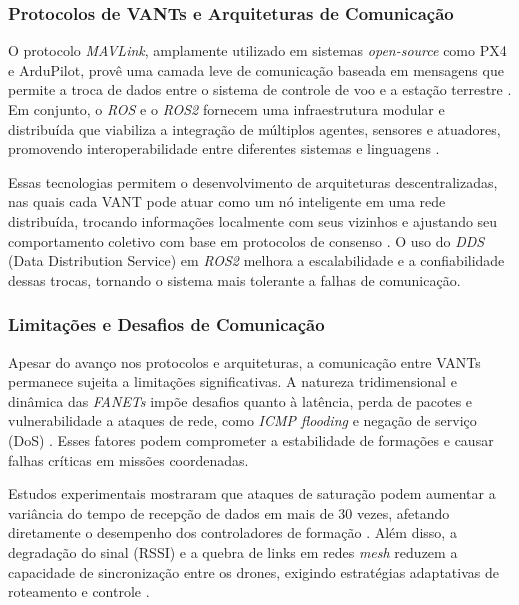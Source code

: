 \subsubsection{Protocolos de VANTs e Arquiteturas de Comunicação}

O protocolo \textit{MAVLink}, amplamente utilizado em sistemas \textit{open-source} como PX4 e ArduPilot, provê uma camada leve de comunicação baseada em mensagens que permite a troca de dados entre o sistema de controle de voo e a estação terrestre \citep{Young-Min2018}. Em conjunto, o \textit{ROS} e o \textit{ROS2} fornecem uma infraestrutura modular e distribuída que viabiliza a integração de múltiplos agentes, sensores e atuadores, promovendo interoperabilidade entre diferentes sistemas e linguagens \citep{khaliq2021, ziming2023}.

Essas tecnologias permitem o desenvolvimento de arquiteturas descentralizadas, nas quais cada VANT pode atuar como um nó inteligente em uma rede distribuída, trocando informações localmente com seus vizinhos e ajustando seu comportamento coletivo com base em protocolos de consenso \citep{ren2007consensus, bu2024advancement}. O uso do \textit{DDS} (Data Distribution Service) em \textit{ROS2} melhora a escalabilidade e a confiabilidade dessas trocas, tornando o sistema mais tolerante a falhas de comunicação.

\subsubsection{Limitações e Desafios de Comunicação}

Apesar do avanço nos protocolos e arquiteturas, a comunicação entre VANTs permanece sujeita a limitações significativas. A natureza tridimensional e dinâmica das \textit{FANETs} impõe desafios quanto à latência, perda de pacotes e vulnerabilidade a ataques de rede, como \textit{ICMP flooding} e negação de serviço (DoS) \citep{Young-Min2018}. Esses fatores podem comprometer a estabilidade de formações e causar falhas críticas em missões coordenadas.

Estudos experimentais mostraram que ataques de saturação podem aumentar a variância do tempo de recepção de dados em mais de 30 vezes, afetando diretamente o desempenho dos controladores de formação \citep{Young-Min2018}. Além disso, a degradação do sinal (RSSI) e a quebra de links em redes \textit{mesh} reduzem a capacidade de sincronização entre os drones, exigindo estratégias adaptativas de roteamento e controle \citep{hong2020swarm, khaliq2021}.

